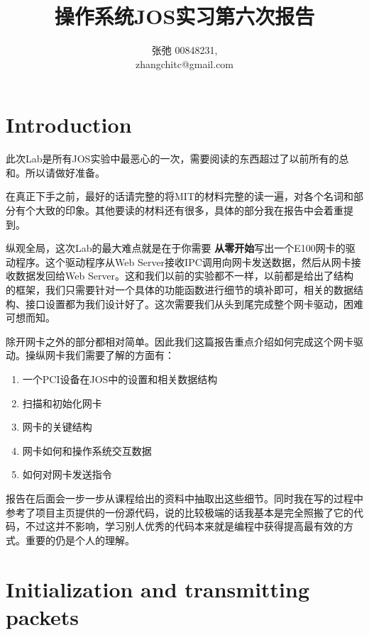 \documentclass{article}
\newcommand{\highlight}[1]{{\bfseries \color{red}  #1}}
\begin{document}
\begin{CJK*}{UTF8}{gkai}

\title{操作系统JOS实习第六次报告}
\author{张弛 \hspace{1ex} 00848231, \\
        zhangchitc@gmail.com}

\maketitle
\tableofcontents
\newpage

\section{Introduction}

此次Lab是所有JOS实验中最恶心的一次，需要阅读的东西超过了以前所有的总和。所以请做好准备。

在真正下手之前，最好的话请完整的将MIT的材料完整的读一遍，对各个名词和部分有个大致的印象。其他要读的材料还有很多，具体的部分我在报告中会着重提到。


纵观全局，这次Lab的最大难点就是在于你需要\highlight{从零开始}写出一个E100网卡的驱动程序。这个驱动程序从Web Server接收IPC调用向网卡发送数据，然后从网卡接收数据发回给Web Server。这和我们以前的实验都不一样，以前都是给出了结构的框架，我们只需要针对一个具体的功能函数进行细节的填补即可，相关的数据结构、接口设置都为我们设计好了。这次需要我们从头到尾完成整个网卡驱动，困难可想而知。

除开网卡之外的部分都相对简单。因此我们这篇报告重点介绍如何完成这个网卡驱动。操纵网卡我们需要了解的方面有：

\begin{enumerate}
\item{一个PCI设备在JOS中的设置和相关数据结构}
\item{扫描和初始化网卡}
\item{网卡的关键结构}
\item{网卡如何和操作系统交互数据}
\item{如何对网卡发送指令}
\end{enumerate}

报告在后面会一步一步从课程给出的资料中抽取出这些细节。同时我在写的过程中参考了项目主页提供的一份源代码，说的比较极端的话我基本是完全照搬了它的代码，不过这并不影响，学习别人优秀的代码本来就是编程中获得提高最有效的方式。重要的仍是个人的理解。


\section{Initialization and transmitting packets}


\end{CJK*}
\end{document}
